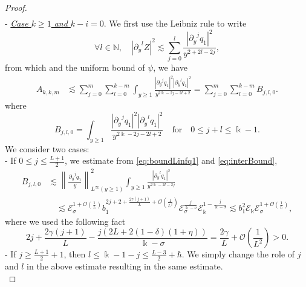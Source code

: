 \documentclass[11pt]{aims}
\theoremstyle{definition}
\numberwithin{equation}{section}
\begin{document}
\begin{proof}
\begin{align*}
\end{align*} 
\noindent  - \underline{\textit{Case $k \geq 1$ and $k - i = 0$}}. We first use the Leibniz rule to write
\begin{equation}\label{eq:pylZexp}
\forall l \in \mathbb{N}, \quad |{\partial_y}^l Z|^2 \lesssim \sum_{j = 0}^l \frac{|{\partial_y}^j q_1|^2}{y^{2 + 2l - 2j}},
\end{equation}
from which and the uniform bound of $\psi$, we have
\begin{align*}
A_{k,k,m} &\lesssim \sum_{j = 0}^m \sum_{l = 0}^{k-m} \int_{y \geq 1} \frac{|{\partial_y}^j q_1|^2 |{\partial_y}^l q_1|^2}{y^{2 \Bbbk - 2j - 2l + 2}} = \sum_{j = 0}^m \sum_{l = 0}^{k-m} B_{j,l,0}.
\end{align*}
where 
$$B_{j,l,0} = \int_{y \geq 1} \frac{|{\partial_y}^j q_1|^2 |{\partial_y}^l q_1|^2}{y^{2 \Bbbk - 2j - 2l + 2}} \quad \text{for} \quad 0 \leq j +l \leq \Bbbk -1.$$
We consider two cases: \\
- If $0 \leq j \leq \frac{L + 1}{2}$, we estimate from \eqref{eq:boundLinfq1} and  \eqref{eq:interBound}, 
\begin{align*}
B_{j,l,0}  &\lesssim \left\|\frac{{\partial_y}^j q_1}{y} \right\|^2_{L^\infty(y \geq 1)}\int_{y \geq 1} \frac{|{\partial_y}^lq_1|^2}{y^{2\Bbbk  -2l - 2j}} \\
&\quad \lesssim {\mathscr{E}}_\sigma^{1 + {\mathcal{O}}\left(\frac{1}{L} \right)}b_1^{2j + 2 + \frac{2\gamma(j + 1)}{L} + {\mathcal{O}}\left(\frac{1}{L^2}\right)}{\mathscr{E}}_{\sigma}^\frac{j}{\Bbbk - \sigma} {\mathscr{E}}_{\Bbbk}^{1 - \frac{j}{\Bbbk - \sigma}} \lesssim b_1^2{\mathscr{E}}_\Bbbk{\mathscr{E}}_\sigma^{1 + {\mathcal{O}}\left(\frac{1}{L} \right)},
\end{align*}
where we used the following fact
$$2j + \frac{2\gamma(j + 1)}{L} - \frac{j(2L + 2(1 - \delta)(1 + \eta))}{\Bbbk - \sigma} = \frac{2\gamma}{L} + {\mathcal{O}}\left(\frac{1}{L^2}\right) > 0.$$
- If $j \geq \frac{L + 1}{2} + 1$, then $l \leq \Bbbk - 1 - j \leq \frac{L - 3}{2} + \hbar$. We simply change the role of $j$ and $l$ in the above estimate resulting in the same estimate.\\


\end{proof}
\end{document}
